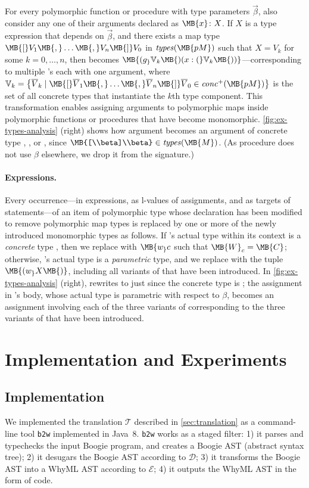 \documentclass[a4paper,final]{llncs}
\makeatletter
\newcommand{\tr}{\mathcal{T}}
\newcommand{\enc}{\mathcal{E}}
\newcommand{\des}{\mathcal{D}}
\newcommand{\btw}{\texttt{b2w}\xspace}
\newcommand{\Boogie}{Boogie\xspace}
\newcommand{\WhyML}{WhyML\xspace}
\newcommand{\tightParagraph}[1]{\paragraph{#1}}
\newcommand\tightParagraph{\@startsection{paragraph}{4}{\z@}{-5\p@ \@plus -4\p@ \@minus -4\p@}{-0.5em \@plus -0.22em \@minus -0.1em}{\normalfont\normalsize\itshape}}
\newcommand{\typesOf}[1]{\mathit{types}(\MB{#1})}
\newcommand{\concPlus}[1]{\mathit{conc}^+(\MB{#1})}
\makeatother
\begin{document}
For every polymorphic function or procedure  with type parameters $\vec{\beta}$, also consider any one of their arguments declared as $\MB{x}\colon X$.
If $X$ is a type expression that depends on $\vec{\beta}$, and there exists a map type $\MB{[}V_1\MB{,}\ldots\MB{,}V_n\MB{]}V_0$ in $\typesOf{pM}$ such that $X = V_k$ for some $k = 0, \ldots, n$, then  becomes $\MB{(g_}\mathbb{V}_k\MB{)(x: (}\mathbb{V}_k\MB{))}$---corresponding to multiple 's each with one argument, where $\mathbb{V}_k = \left\{ \overline{V}_k \mid \MB{[}\overline{V}_1\MB{,}\ldots\MB{,}\overline{V}_n\MB{]}\overline{V}_0 \in \concPlus{pM} \right\}$ is the set of all concrete types that instantiate the $k$th type component.
This transformation enables assigning arguments to polymorphic maps inside polymorphic functions or procedures that have become monomorphic.
\autoref{fig:ex-types-analysis} (right) shows how argument  becomes an argument of concrete type , , or , since $\MB{[\\beta]\\beta} \in \typesOf{M}$.
(As procedure  does not use $\beta$ elsewhere, we drop it from the signature.)


\tightParagraph{Expressions.}
Every occurrence---in expressions, as l-values of assignments, and as targets of  statements---of an item  of polymorphic type  whose declaration has been modified to remove polymorphic map types is replaced by one or more of the newly introduced monomorphic types as follows.
If 's actual type within its context is a \emph{concrete} type , then we replace  with $\MB{w_}c$ such that $\MB{W}_c = \MB{C}$; otherwise, 's actual type is a \emph{parametric} type, and we replace  with the tuple $\MB{(w_}X\MB{)}$, including all variants of  that have been introduced.
In \autoref{fig:ex-types-analysis} (right),  rewrites to just  since the concrete type is ; the assignment in 's body, whose actual type is parametric with respect to $\beta$, becomes an assignment involving each of the three variants of  corresponding to the three variants of  that have been introduced.


\section{Implementation and Experiments}\label{sec:experiments}


\subsection{Implementation}
We implemented the translation $\tr$ described in \autoref{sec:translation} as a command-line tool \btw implemented in Java~8.
\btw works as a staged filter: 1) it parses and typechecks the input \Boogie program, and creates a \Boogie AST (abstract syntax tree); 2) it desugars the \Boogie AST according to $\des$; 3) it transforms the \Boogie AST into a \WhyML AST according to $\enc$; 4) it outputs the \WhyML AST in the form of code. 
\end{document}
